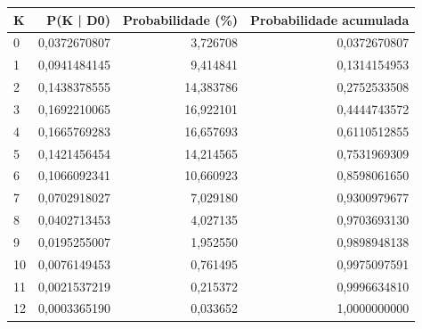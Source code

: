 \begin{tabular}{lrrr}
\toprule
K & P(K | D0) & Probabilidade (\%) & Probabilidade acumulada \\
\midrule
0 & 0,0372670807 & 3,726708 & 0,0372670807 \\
1 & 0,0941484145 & 9,414841 & 0,1314154953 \\
2 & 0,1438378555 & 14,383786 & 0,2752533508 \\
3 & 0,1692210065 & 16,922101 & 0,4444743572 \\
4 & 0,1665769283 & 16,657693 & 0,6110512855 \\
5 & 0,1421456454 & 14,214565 & 0,7531969309 \\
6 & 0,1066092341 & 10,660923 & 0,8598061650 \\
7 & 0,0702918027 & 7,029180 & 0,9300979677 \\
8 & 0,0402713453 & 4,027135 & 0,9703693130 \\
9 & 0,0195255007 & 1,952550 & 0,9898948138 \\
10 & 0,0076149453 & 0,761495 & 0,9975097591 \\
11 & 0,0021537219 & 0,215372 & 0,9996634810 \\
12 & 0,0003365190 & 0,033652 & 1,0000000000 \\
\bottomrule
\end{tabular}
